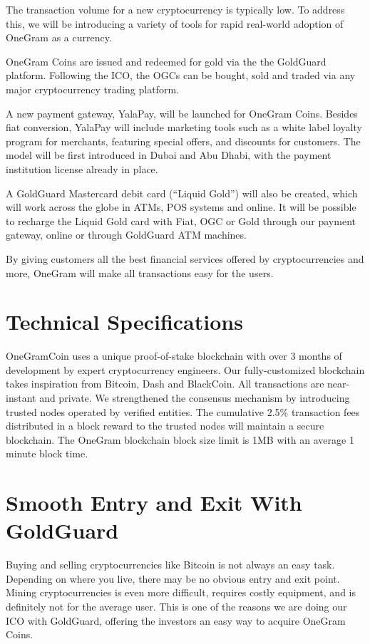 \documentclass[letterpaper,11pt]{article}
\begin{document}
The transaction volume for a new cryptocurrency is typically low. To address this, we will be introducing a variety of tools for rapid real-world adoption of OneGram as a currency.

OneGram Coins are issued and redeemed for gold via the the GoldGuard platform. Following the ICO, the OGCs can be bought, sold and traded via any major cryptocurrency trading platform.

A new payment gateway, YalaPay, will be launched for OneGram Coins. Besides fiat conversion, YalaPay will include marketing tools such as a white label loyalty program for merchants, featuring special offers, and discounts for customers. The model will be first introduced in Dubai and Abu Dhabi, with the payment institution license already in place.

A GoldGuard Mastercard debit card (“Liquid Gold”) will also be created, which will work across the globe in ATMs, POS systems and online. It will be possible to recharge the Liquid Gold card with Fiat, OGC or Gold through our payment gateway, online or through GoldGuard ATM machines.

By giving customers all the best financial services offered by cryptocurrencies and more, OneGram will make all transactions easy for the users.

\section{Technical Specifications}

OneGramCoin uses a unique proof-of-stake blockchain with over 3 months of development by expert cryptocurrency engineers. Our fully-customized blockchain takes inspiration from Bitcoin, Dash and BlackCoin. All transactions are near-instant and private. We strengthened the consensus mechanism by introducing trusted nodes operated by verified entities. The cumulative 2.5\% transaction fees distributed in a block reward to the trusted nodes will maintain a secure blockchain. The OneGram blockchain block size limit is 1MB with an average 1 minute block time.

\section{Smooth Entry and Exit With GoldGuard}

Buying and selling cryptocurrencies like Bitcoin is not always an easy task. Depending on where you live, there may be no obvious entry and exit point. Mining cryptocurrencies is even more difficult, requires costly equipment, and is definitely not for the average user. This is one of the reasons we are doing our ICO with GoldGuard, offering the investors an easy way to acquire OneGram Coins.
\end{document}
